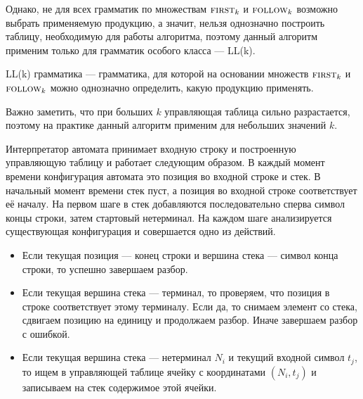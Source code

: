 Однако, не для всех грамматик по множествам $\first[k]$ и $\follow[k]$ возможно выбрать применяемую продукцию, а значит, нельзя однозначно построить таблицу, необходимую для работы алгоритма, поэтому данный алгоритм применим только для грамматик особого класса --- LL(k).

\begin{definition}
  LL(k) грамматика --- грамматика, для которой на основании множеств $\first[k]$ и $\follow[k]$ можно однозначно определить, какую продукцию применять.
\end{definition}

Важно заметить, что при больших $k$ управляющая таблица сильно разрастается, поэтому на практике данный алгоритм применим для небольших значений $k$.

Интерпретатор автомата принимает входную строку и построенную управляющую таблицу и работает следующим образом.
В каждый момент времени конфигурация автомата это позиция во входной строке и стек.
В начальный момент времени стек пуст, а позиция во входной строке соответствует её началу.
На первом шаге в стек добавляются последовательно сперва символ концы строки, затем стартовый нетерминал.
На каждом шаге анализируется существующая конфигурация и совершается одно из действий.
\begin{itemize}
\item Если текущая позиция --- конец строки и вершина стека --- символ конца строки, то успешно завершаем разбор.
\item Если текущая вершина стека --- терминал, то проверяем, что позиция в строке соответствует этому терминалу. Если да, то снимаем элемент со стека, сдвигаем позицию на единицу и продолжаем разбор. Иначе завершаем разбор с ошибкой.
\item Если текущая вершина стека --- нетерминал $N_i$ и текущий входной символ $t_j$, то ищем в управляющей таблице ячейку с координатами $(N_i, t_j)$ и записываем на стек содержимое этой ячейки.
\end{itemize}

